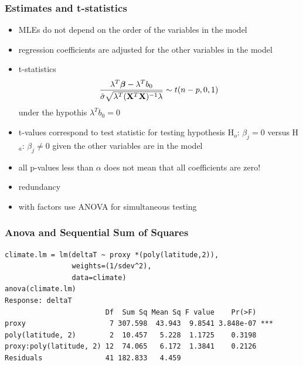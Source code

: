 \documentclass[handout]{beamer}
\begin{document}
\begin{frame}
  \frametitle{Estimates and t-statistics}
  \begin{itemize}
  \item MLEs do not depend on the order of the variables in the model \pause
  \item regression coefficients are adjusted for the other variables
    in the model \pause
\item t-statistics  $$\frac{\lambda^T\boldsymbol{\beta} - \lambda^Tb_0} 
{ \hat{\sigma} \sqrt{\lambda^T (\mathbf{X}^T\mathbf{X})^{-1} \lambda}} \sim t(n - p, 0,
1)$$
under the hypothis $\lambda^Tb_0 = 0$
  \item t-values  correspond to test statistic for testing hypothesis
    H$_o$: $\beta_j = 0$ versus H$_a$: $\beta_j \neq 0$ given  the
    other variables are in the model \pause
  \item all p-values less than $\alpha$ does not mean that all
    coefficients are zero! \pause
 \item redundancy \pause
 \item with factors use ANOVA for simultaneous testing \pause
  \end{itemize}
\end{frame}

\begin{frame}[fragile]
  \frametitle{Anova and Sequential Sum of Squares }
  \begin{small}
\begin{verbatim}
climate.lm = lm(deltaT ~ proxy *(poly(latitude,2)),
                weights=(1/sdev^2), 
                data=climate)
anova(climate.lm)
Response: deltaT
                        Df  Sum Sq Mean Sq F value    Pr(>F)    
proxy                    7 307.598  43.943  9.8541 3.848e-07 ***
poly(latitude, 2)        2  10.457   5.228  1.1725    0.3198    
proxy:poly(latitude, 2) 12  74.065   6.172  1.3841    0.2126    
Residuals               41 182.833   4.459  
\end{verbatim}
    
\end{small}

\end{frame}
\end{document}
